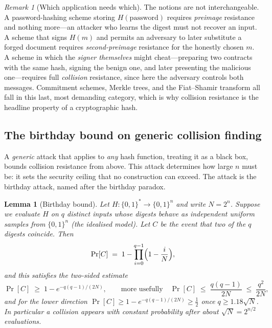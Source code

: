 \documentclass[11pt,a4paper]{article}
\newtheorem{lemma}[theorem]{Lemma}
\theoremstyle{definition}
\theoremstyle{remark}
\newtheorem{remark}[theorem]{Remark}
\begin{document}
\begin{remark}[Which application needs which]\label{hash:rem:whichneeds}
The notions are not interchangeable. A password-hashing scheme storing \(H(\text{password})\) requires \emph{preimage} resistance and nothing more---an attacker who learns the digest must not recover an input. A scheme that signs \(H(m)\) and permits an adversary to later substitute a forged document requires \emph{second-preimage} resistance for the honestly chosen \(m\). A scheme in which the \emph{signer themselves} might cheat---preparing two contracts with the same hash, signing the benign one, and later presenting the malicious one---requires full \emph{collision} resistance, since here the adversary controls both messages. Commitment schemes, Merkle trees, and the Fiat--Shamir transform all fall in this last, most demanding category, which is why collision resistance is the headline property of a cryptographic hash.
\end{remark}

\subsection{The birthday bound on generic collision finding}\label{hash:sub:birthday}

A \emph{generic} attack that applies to \emph{any} hash function, treating it as a black box, bounds collision resistance from above. This attack determines how large \(n\) must be: it sets the security ceiling that no construction can exceed. The attack is the birthday attack, named after the birthday paradox.

\begin{lemma}[Birthday bound]\label{hash:lem:birthday}
Let \(H \colon \{0,1\}^{*} \to \{0,1\}^{n}\) and write \(N = 2^{n}\). Suppose we evaluate \(H\) on \(q\) distinct inputs whose digests behave as independent uniform samples from \(\{0,1\}^{n}\) (the idealised model). Let \(C\) be the event that two of the \(q\) digests coincide. Then
\[
  \Pr[C] \;=\; 1 - \prod_{i=0}^{q-1}\Bigl(1 - \frac{i}{N}\Bigr),
\]
and this satisfies the two-sided estimate
\[
  \Pr[C] \;\geq\; 1 - e^{-q(q-1)/(2N)},\qquad
  \text{more usefully}\quad
  \Pr[C] \;\leq\; \frac{q(q-1)}{2N} \;\leq\; \frac{q^{2}}{2N},
\]
and for the lower direction \(\Pr[C] \geq 1 - e^{-q(q-1)/(2N)} \geq \tfrac{1}{2}\) once \(q \geq 1.18\sqrt{N}\). In particular a collision appears with constant probability after about \(\sqrt{N} = 2^{n/2}\) evaluations.
\end{lemma}
\end{document}
